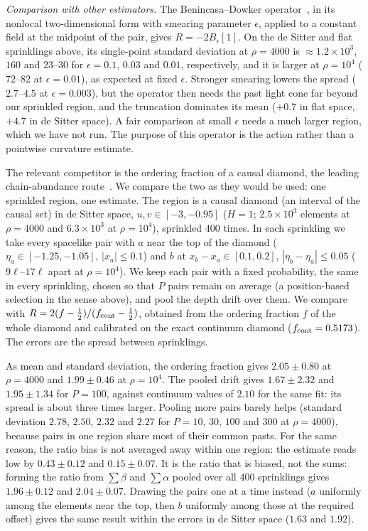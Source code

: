 \documentclass[12pt]{iopart}
\begin{document}
\emph{Comparison with other estimators.} The Benincasa--Dowker operator~\cite{BD10}, in its nonlocal two-dimensional form with smearing parameter $\epsilon$, applied to a constant field at the midpoint of the pair, gives $R=-2B_\epsilon[1]$. On the de Sitter and flat sprinklings above, its single-point standard deviation at $\rho=4000$ is $\approx1.2\times10^3$, $160$ and $23$--$30$ for $\epsilon=0.1$, $0.03$ and $0.01$, respectively, and it is larger at $\rho=10^4$ ($72$--$82$ at $\epsilon=0.01$), as expected at fixed $\epsilon$. Stronger smearing lowers the spread ($2.7$--$4.5$ at $\epsilon=0.003$), but the operator then needs the past light cone far beyond our sprinkled region, and the truncation dominates its mean ($+0.7$ in flat space, $+4.7$ in de Sitter space). A fair comparison at small $\epsilon$ needs a much larger region, which we have not run. The purpose of this operator is the action rather than a pointwise curvature estimate.

The relevant competitor is the ordering fraction of a causal diamond, the leading chain-abundance route~\cite{RSS13}. We compare the two as they would be used: one sprinkled region, one estimate. The region is a causal diamond (an interval of the causal set) in de Sitter space, $u,v\in[-3,-0.95]$ ($H=1$; $2.5\times10^3$ elements at $\rho=4000$ and $6.3\times10^3$ at $\rho=10^4$), sprinkled 400 times. In each sprinkling we take every spacelike pair with $a$ near the top of the diamond ($\eta_a\in[-1.25,-1.05]$, $|x_a|\leq0.1$) and $b$ at $x_b-x_a\in[0.1,0.2]$, $|\eta_b-\eta_a|\leq0.05$ ($9\ell$--$17\ell$ apart at $\rho=10^4$). We keep each pair with a fixed probability, the same in every sprinkling, chosen so that $P$ pairs remain on average (a position-based selection in the sense above), and pool the depth drift over them. We compare with $R=2(f-\tfrac12)/(f_{\rm cont}-\tfrac12)$, obtained from the ordering fraction $f$ of the whole diamond and calibrated on the exact continuum diamond ($f_{\rm cont}=0.5173$). The errors are the spread between sprinklings.

As mean and standard deviation, the ordering fraction gives $2.05\pm0.80$ at $\rho=4000$ and $1.99\pm0.46$ at $\rho=10^4$. The pooled drift gives $1.67\pm2.32$ and $1.95\pm1.34$ for $P=100$, against continuum values of $2.10$ for the same fit: its spread is about three times larger. Pooling more pairs barely helps (standard deviation $2.78$, $2.50$, $2.32$ and $2.27$ for $P=10$, $30$, $100$ and $300$ at $\rho=4000$), because pairs in one region share most of their common pasts. For the same reason, the ratio bias is not averaged away within one region: the estimate reads low by $0.43\pm0.12$ and $0.15\pm0.07$. It is the ratio that is biased, not the sums: forming the ratio from $\sum\beta$ and $\sum\alpha$ pooled over all 400 sprinklings gives $1.96\pm0.12$ and $2.04\pm0.07$. Drawing the pairs one at a time instead ($a$ uniformly among the elements near the top, then $b$ uniformly among those at the required offset) gives the same result within the errors in de Sitter space ($1.63$ and $1.92$).
\end{document}
